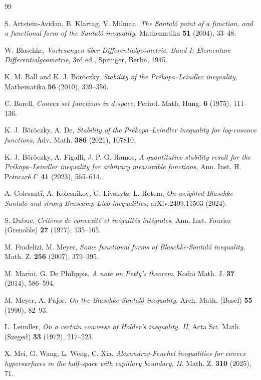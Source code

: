 \documentclass[12pt]{amsart}
\numberwithin{equation}{section}
\newcommand{\8}{\infty}
\renewcommand{\(}{\left(}
\renewcommand{\)}{\right)}
\begin{document}
\begin{thebibliography}{99}

S. Artstein-Avidan, B. Klartag, V. Milman, \textit{The Santal\'o point of a function, and a functional form of the Santal\'o inequality}, Mathematika \textbf{51} (2004), 33--48.

W. Blaschke, \textit{Vorlesungen \"uber Differentialgeometrie. Band I: Elementare Differentialgeometrie}, 3rd ed., Springer, Berlin, 1945.

K. M. Ball and K. J. B\"or\"oczky, \textit{Stability of the Pr\'ekopa--Leindler inequality}, Mathematika \textbf{56} (2010), 339--356.

C. Borell, \textit{Convex set functions in $d$-space}, Period. Math. Hung. \textbf{6} (1975), 111--136.

K. J. B\"or\"oczky, A. De, \textit{Stability of the Pr\'ekopa--Leindler inequality for log-concave functions}, Adv. Math. \textbf{386} (2021), 107810.

K. J. B\"or\"oczky, A. Figalli, J. P. G. Ramos, \textit{A quantitative stability result for the Pr\'ekopa--Leindler inequality for arbitrary measurable functions},  Ann. Inst. H. Poincar\'e C \textbf{41} (2023), 565--614.

A. Colesanti, A. Kolesnikov, G. Livshyts, L. Rotem, \textit{On weighted Blaschke-Santal\'o and strong Brascamp-Lieb inequalities}, arXiv:2409.11503 (2024).

S. Dubuc, \textit{Crit\`eres de convexit\'e et in\'egalit\'es int\'egrales}, Ann. Inst. Fourier (Grenoble) \textbf{27} (1977), 135--165.

M. Fradelizi, M. Meyer, \textit{Some functional forms of Blaschke-Santal\'o inequality}, Math. Z. \textbf{256} (2007), 379--395.

M. Marini, G. De Philippis, \textit{A note on Petty's theorem}, Kodai Math. J. \textbf{37} (2014), 586--594.

M. Meyer, A. Pajor, \textit{On the Blaschke-Santal\'o inequality}, Arch. Math. (Basel) \textbf{55} (1990), 82--93.

L. Leindler, \textit{On a certain converse of H\"older's inequality. II}, Acta Sci. Math. (Szeged) \textbf{33} (1972), 217--223.

X. Mei, G. Wang, L. Weng, C. Xia, \textit{Alexandrov-Fenchel inequalities for convex hypersurfaces in the half-space with capillary boundary, II}, Math. Z. \textbf{310} (2025), 71.


\end{thebibliography}
\end{document}
